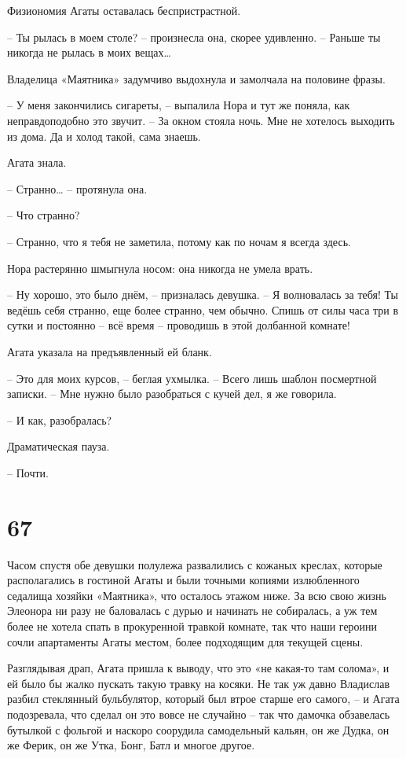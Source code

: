 \documentclass[
  a5paperpaper,
  DIV=11,
  numbers=noendperiod]{scrreprt}
\begin{document}
Физиономия Агаты оставалась беспристрастной.

-- Ты рылась в моем столе? -- произнесла она, скорее удивленно. --
Раньше ты никогда не рылась в моих вещах\ldots{}

Владелица «Маятника» задумчиво выдохнула и замолчала на половине фразы.

-- У меня закончились сигареты, -- выпалила Нора и тут же поняла, как
неправдоподобно это звучит. -- За окном стояла ночь. Мне не хотелось
выходить из дома. Да и холод такой, сама знаешь.

Агата знала.

-- Странно\ldots{} -- протянула она.

-- Что странно?

-- Странно, что я тебя не заметила, потому как по ночам я всегда здесь.

Нора растерянно шмыгнула носом: она никогда не умела врать.

-- Ну хорошо, это было днём, -- призналась девушка. -- Я волновалась за
тебя! Ты ведёшь себя странно, еще более странно, чем обычно. Спишь от
силы часа три в сутки и постоянно -- всё время -- проводишь в этой
долбанной комнате!

Агата указала на предъявленный ей бланк.

-- Это для моих курсов, -- беглая ухмылка. -- Всего лишь шаблон
посмертной записки. -- Мне нужно было разобраться с кучей дел, я же
говорила.

-- И как, разобралась?

Драматическая пауза.

-- Почти.

\section*{67}\label{67}


Часом спустя обе девушки полулежа развалились с кожаных креслах, которые
располагались в гостиной Агаты и были точными копиями излюбленного
седалища хозяйки «Маятника», что осталось этажом ниже. За всю свою жизнь
Элеонора ни разу не баловалась с дурью и начинать не собиралась, а уж
тем более не хотела спать в прокуренной травкой комнате, так что наши
героини сочли апартаменты Агаты местом, более подходящим для текущей
сцены.

Разглядывая драп, Агата пришла к выводу, что это «не какая-то там
солома», и ей было бы жалко пускать такую травку на косяки. Не так уж
давно Владислав разбил стеклянный бульбулятор, который был втрое старше
его самого, -- и Агата подозревала, что сделал он это вовсе не случайно
-- так что дамочка обзавелась бутылкой с фольгой и наскоро соорудила
самодельный кальян, он же Дудка, он же Ферик, он же Утка, Бонг, Батл и
многое другое.
\end{document}
